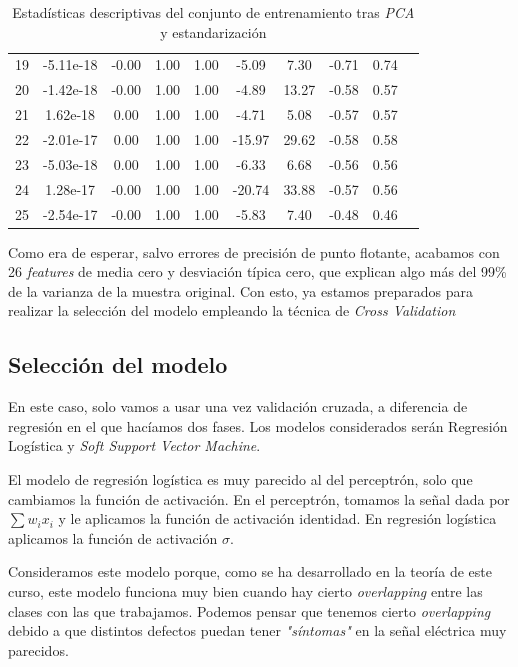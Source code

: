 \documentclass[11pt]{article}
\begin{document}
\begin{table}[H]
\begin{tabular}{|c|c|c|c|c|c|c|c|c|c|}
19              &-5.11e-18 &-0.00  &1.00  &1.00 & -5.09 &  7.30 &-0.71  &0.74 \\
20              &-1.42e-18 &-0.00  &1.00  &1.00 & -4.89 & 13.27 &-0.58  &0.57 \\
21              & 1.62e-18 & 0.00  &1.00  &1.00 & -4.71 &  5.08 &-0.57  &0.57 \\
22              &-2.01e-17 & 0.00  &1.00  &1.00 &-15.97 & 29.62 &-0.58  &0.58 \\
23              &-5.03e-18 & 0.00  &1.00  &1.00 & -6.33 &  6.68 &-0.56  &0.56 \\
24              & 1.28e-17 &-0.00  &1.00  &1.00 &-20.74 & 33.88 &-0.57  &0.56 \\
25              &-2.54e-17 &-0.00  &1.00  &1.00 & -5.83 &  7.40 &-0.48  &0.46 \\
\hline
\end{tabular}
    \caption{Estadísticas descriptivas del conjunto de entrenamiento tras \emph{PCA} y estandarización}
\end{table}

Como era de esperar, salvo errores de precisión de punto flotante, acabamos con 26 \emph{features} de media cero y desviación típica cero, que explican algo más del 99\% de la varianza de la muestra original. Con esto, ya estamos preparados para realizar la selección del modelo empleando la técnica de \emph{Cross Validation}

\pagebreak

\subsection{Selección del modelo}

En este caso, solo vamos a usar una vez validación cruzada, a diferencia de regresión en el que hacíamos dos fases. Los modelos considerados serán Regresión Logística y \emph{Soft Support Vector Machine}.

El modelo de regresión logística es muy parecido al del perceptrón, solo que cambiamos la función de activación. En el perceptrón, tomamos la señal dada por $\sum w_i x_i$ y le aplicamos la función de activación identidad. En regresión logística aplicamos la función de activación $\sigma$.

Consideramos este modelo porque, como se ha desarrollado en la teoría de este curso, este modelo funciona muy bien cuando hay cierto \emph{overlapping} entre las clases con las que trabajamos. Podemos pensar que tenemos cierto \emph{overlapping} debido a que distintos defectos puedan tener \emph{"síntomas"} en la señal eléctrica muy parecidos.
\end{document}
